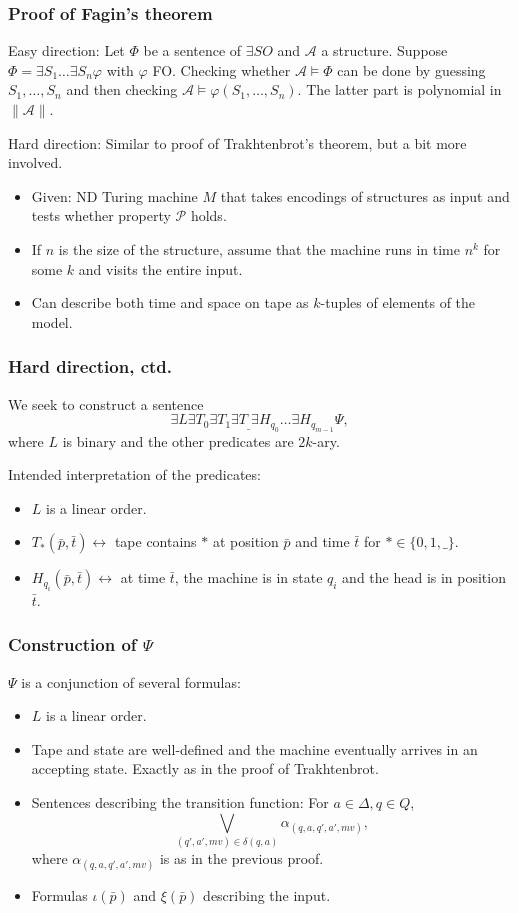 \documentclass{beamer}
\newcommand{\A}{\mathcal{A}}
\renewcommand{\P}{\mathcal{P}}
\begin{document}
\begin{frame}
 \frametitle{Proof of Fagin's theorem}
 Easy direction: Let $Φ$ be a sentence of $\exists SO$ and $\A$ a structure. Suppose $Φ = \exists S_1 … \exists S_n φ$ with $φ$ FO. Checking whether $\A \vDash Φ$ can be done by guessing $S_1,…,S_n$ and then checking $\A \vDash φ(S_1,…,S_n)$. The latter part is polynomial in $\|\A\|$.
 
 \medskip
 
 Hard direction: Similar to proof of Trakhtenbrot's theorem, but a bit more involved.
 \begin{itemize}
 	\item Given: ND Turing machine $M$ that takes encodings of structures as input and tests whether property $\P$ holds.
 	\item If $n$ is the size of the structure, assume that the machine runs in time $n^k$ for some $k$ and visits the entire input.
 	\item Can describe both time and space on tape as $k$-tuples of elements of the model.
 \end{itemize}
\end{frame}

\begin{frame}
	\frametitle{Hard direction, ctd.}
	We seek to construct a sentence
	\begin{equation*}
	∃L ∃T_0 ∃T_1 ∃T_{\_} ∃H_{q_0} … ∃H_{q_{m-1}} Ψ,
	\end{equation*}
	where $L$ is binary and the other predicates are $2k$-ary.
	
	Intended interpretation of the predicates:
	\begin{itemize}
	\item $L$ is a linear order.
	\item $T_{*}(\bar{p}, \bar{t}) \leftrightarrow$ tape contains $*$ at position $\bar{p}$ and time $\bar{t}$ for $* ∈ \{0, 1, \_\}$.
	\item $H_{q_i}(\bar{p},\bar{t}) \leftrightarrow$ at time $\bar{t}$, the machine is in state $q_{i}$ and the head is in position $\bar{t}$.
	\end{itemize}
\end{frame}

\begin{frame}
	\frametitle{Construction of $Ψ$}
	$Ψ$ is a conjunction of several formulas:
	\begin{itemize}
		\item $L$ is a linear order.
		\item Tape and state are well-defined and the machine eventually arrives in an accepting state. Exactly as in the proof of Trakhtenbrot.
		\item Sentences describing the transition function: For $a ∈ Δ, q ∈ Q$,
		\begin{equation*}
		\bigvee_{(q',a',mv) ∈ δ(q,a)} α_{(q,a,q',a',mv)},
		\end{equation*}
		where $α_{(q,a,q',a',mv)}$ is as in the previous proof.
		\item Formulas $ι(\bar{p})$ and $ξ(\bar{p})$ describing the input.
	\end{itemize}
\end{frame}
\end{document}
